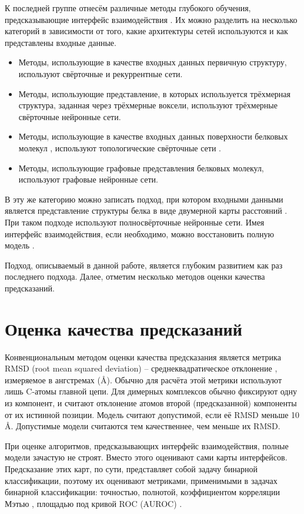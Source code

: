 К последней группе отнесём различные методы глубокого обучения, предсказывающие интерфейс взаимодействия \cite{deep_methods}. Их можно разделить на несколько категорий в зависимости от того, какие архитектуры сетей используются и как представлены входные данные.
\begin{itemize}
\item Методы, использующие в качестве входных данных первичную структуру, используют свёрточные и рекуррентные сети.
\item Методы, использующие представление, в которых используется трёхмерная структура, заданная через трёхмерные воксели, используют трёхмерные свёрточные нейронные сети.
\item Методы, использующие в качестве входных данных поверхности белковых молекул \cite{hang}, используют топологические свёрточные сети \cite{sverrisson}.
\item Методы, использующие графовые представления белковых молекул, используют графовые нейронные сети.
\end{itemize}
В эту же категорию можно записать подход, при котором входными данными является представление структуры белка в виде двумерной карты расстояний \cite{guo}. При таком подходе используют полносвёрточные нейронные сети. Имея интерфейс взаимодействия, если необходимо, можно восстановить полную модель \cite{hadarovich}.

Подход, описываемый в данной работе, является глубоким развитием как раз последнего подхода. Далее, отметим несколько методов оценки качества предсказаний.
\section{Оценка качества предсказаний}

Конвенциональным методом оценки качества предсказания является метрика RMSD (root mean squared deviation) – среднеквадратическое отклонение \cite{kufareva}, измеряемое в ангстремах (\AA). Обычно для расчёта этой метрики  используют лишь C\textalpha-атомы главной цепи. Для димерных комплексов обычно фиксируют одну из компонент, и считают отклонение атомов второй (предсказанной) компоненты от их истинной позиции. Модель считают допустимой, если её RMSD меньше 10 \AA. Допустимые модели считаются тем качественнее, чем меньше их RMSD.

При оценке алгоритмов, предсказывающих интерфейс взаимодействия, полные модели зачастую не строят. Вместо этого оценивают сами карты интерфейсов. Предсказание этих карт, по сути, представляет собой задачу бинарной классификации, поэтому их оценивают метриками, применимыми в задачах бинарной классификации: точностью, полнотой, коэффициентом корреляции Мэтью \cite{deep_methods}, площадью под кривой ROC (AUROC) \cite{bradley}.

